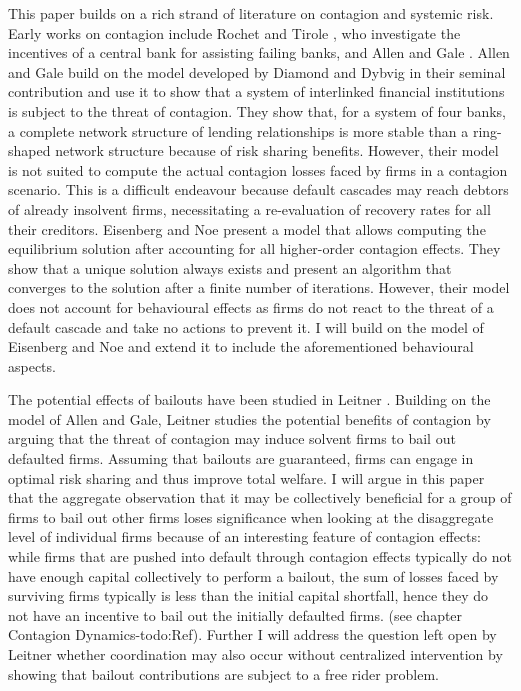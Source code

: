\documentclass[12pt,a4paper]{article}
\begin{document}
This paper builds on a rich strand of literature on contagion and systemic risk. Early works on contagion include Rochet and Tirole \cite{Rochet1996}, who investigate the incentives of a central bank for assisting failing banks, and Allen and Gale \cite{Allen2000}. Allen and Gale build on the model developed by Diamond and Dybvig \cite{Diamond1983} in their seminal contribution and use it to show that a system of interlinked financial institutions is subject to the threat of contagion. They show that, for a system of four banks, a complete network structure of lending relationships is more stable than a ring-shaped network structure because of risk sharing benefits. However, their model is not suited to compute the actual contagion losses faced by firms in a contagion scenario. This is a difficult endeavour because default cascades may reach debtors of already insolvent firms, necessitating a re-evaluation of recovery rates for all their creditors. Eisenberg and Noe \cite{Eisenberg2001} present a model that allows computing the equilibrium solution after accounting for all higher-order contagion effects. They show that a unique solution always exists and present an algorithm that converges to the solution after a finite number of iterations. However, their model does not account for behavioural effects as firms do not react to the threat of a default cascade and take no actions to prevent it. I will build on the model of Eisenberg and Noe and extend it to include the aforementioned behavioural aspects.

The potential effects of bailouts have been studied in Leitner \cite{Leitner2005}. Building on the model of Allen and Gale, Leitner studies the potential benefits of contagion by arguing that the threat of contagion may induce solvent firms to bail out defaulted firms. Assuming that bailouts are guaranteed, firms can engage in optimal risk sharing and thus improve total welfare. I will argue in this paper that the aggregate observation that it may be collectively beneficial for a group of firms to bail out other firms loses significance when looking at the disaggregate level of individual firms because of an interesting feature of contagion effects: while firms that are pushed into default through contagion effects typically do not have enough capital collectively to perform a bailout, the sum of losses faced by surviving firms typically is less than the initial capital shortfall, hence they do not have an incentive to bail out the initially defaulted firms. (see chapter Contagion Dynamics-todo:Ref). Further I will address the question left open by Leitner whether coordination may also occur without centralized intervention by showing that bailout contributions are subject to a free rider problem.
\end{document}
